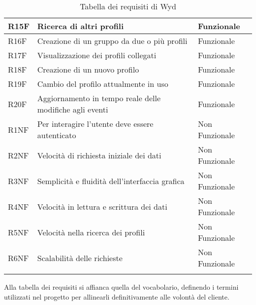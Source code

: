 \begin{longtable} {|P{1.3cm}|P{11.2cm}|P{3cm}|}
    \hline
    R15F        & Ricerca di altri profili                                                    & Funzionale     \\
    \hline
    R16F        & Creazione di un gruppo da due o più profili                                 & Funzionale     \\
    \hline
    R17F        & Visualizzazione dei profili collegati                                       & Funzionale     \\
    \hline
    R18F        & Creazione di un nuovo profilo                                               & Funzionale     \\
    \hline
    R19F        & Cambio del profilo attualmente in uso                                       & Funzionale     \\
    \hline
    R20F        & Aggiornamento in tempo reale delle modifiche agli eventi                    & Funzionale     \\
    \hline
    R1NF        & Per interagire l’utente deve essere autenticato                             & Non Funzionale \\
    \hline
    R2NF        & Velocità di richiesta iniziale dei dati                                     & Non Funzionale \\
    \hline
    R3NF        & Semplicità e fluidità dell'interfaccia grafica                              & Non Funzionale \\
    \hline
    R4NF        & Velocità in lettura e scrittura dei dati                                    & Non Funzionale \\
    \hline
    R5NF        & Velocità nella ricerca dei profili                                          & Non Funzionale \\
    \hline
    R6NF        & Scalabilità delle richieste                                                 & Non Funzionale \\
    \hline
    \caption{Tabella dei requisiti di Wyd}
\end{longtable}


Alla tabella dei requisiti si affianca quella del vocabolario,
definendo i termini utilizzati nel progetto per allinearli definitivamente alle volontà del cliente.\\

